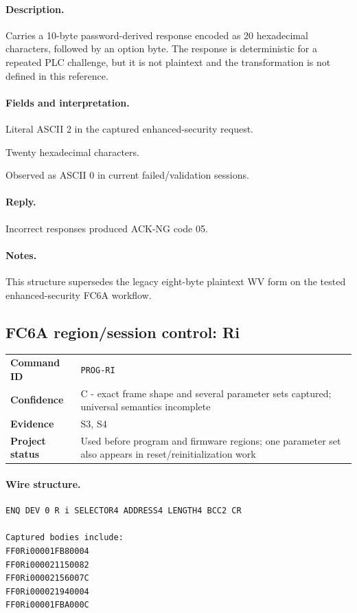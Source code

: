 \documentclass[10pt,letterpaper]{article}
\begin{document}
\paragraph{Description.} Carries a 10-byte password-derived response encoded as 20 hexadecimal characters, followed by an option byte. The response is deterministic for a repeated PLC challenge, but it is not plaintext and the transformation is not defined in this reference.
\paragraph{Fields and interpretation.}
\begin{description}[style=nextline,leftmargin=3.2cm,labelwidth=3.0cm,font=\normalfont\bfseries]
\item[Continuation] Literal ASCII 2 in the captured enhanced-security request.
\item[RESPONSE20] Twenty hexadecimal characters.
\item[OPTION] Observed as ASCII 0 in current failed/validation sessions.
\end{description}
\paragraph{Reply.} Incorrect responses produced ACK-NG code 05.
\paragraph{Notes.} This structure supersedes the legacy eight-byte plaintext WV form on the tested enhanced-security FC6A workflow.

\subsection{FC6A region/session control: Ri}
\begin{tabularx}{\textwidth}{@{}>{\bfseries}p{2.8cm}X@{}}
Command ID & \texttt{PROG-RI} \\
Confidence & C - exact frame shape and several parameter sets captured; universal semantics incomplete \\
Evidence & S3, S4 \\
Project status & Used before program and firmware regions; one parameter set also appears in reset/reinitialization work \\
\end{tabularx}
\vspace{0.35em}
\paragraph{Wire structure.}
\begin{Verbatim}[breaklines=true,breakanywhere=true,fontsize=\small]
ENQ DEV 0 R i SELECTOR4 ADDRESS4 LENGTH4 BCC2 CR

Captured bodies include:
FF0Ri00001FB80004
FF0Ri000021150082
FF0Ri00002156007C
FF0Ri000021940004
FF0Ri00001FBA000C
\end{Verbatim}
\end{document}

